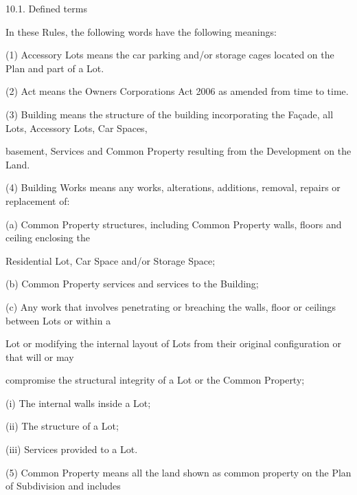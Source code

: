 \documentclass{article}
\begin{document}
{\fontsize{9.99}{1}10.1. Defined terms }

{\fontsize{10.02}{1}In these Rules, the following words have the following meanings: }

{\fontsize{9.962}{1}(1) Accessory Lots means the car parking and/or storage cages located on the Plan and part of a Lot. }

{\fontsize{9.962}{1}(2) Act means the Owners Corporations Act 2006 as amended from time to time. }

{\fontsize{9.962}{1}(3) Building means the structure of the building incorporating the Façade, all Lots, Accessory Lots, Car Spaces, }

{\fontsize{10.02}{1}basement, Services and Common Property resulting from the Development on the Land.  }

{\fontsize{9.962}{1}(4) Building Works means any works, alterations, additions, removal, repairs or replacement of: }

{\fontsize{9.962}{1}(a) Common Property structures, including Common Property walls, floors and ceiling enclosing the }

{\fontsize{10.02}{1}Residential Lot, Car Space and/or Storage Space; }

{\fontsize{9.962}{1}(b) Common Property services and services to the Building; }

{\fontsize{9.962}{1}(c) Any work that involves penetrating or breaching the walls, floor or ceilings between Lots or within a }

{\fontsize{10.02}{1}Lot or modifying the internal layout of Lots from their original configuration or that will or may }

{\fontsize{10.02}{1}compromise the structural integrity of a Lot or the Common Property; }

{\fontsize{9.962}{1}(i) The internal walls inside a Lot; }

\newpage


















{\fontsize{9.962}{1}(ii) The structure of a Lot; }

{\fontsize{9.962}{1}(iii) Services provided to a Lot. }


{\fontsize{9.962}{1}(5) Common Property means all the land shown as common property on the Plan of Subdivision and includes }
\end{document}
